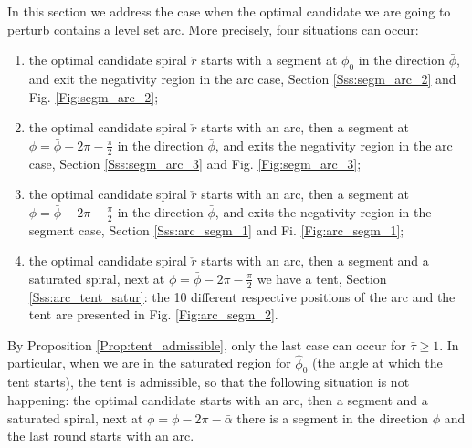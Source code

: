 \documentclass[reqno]{amsart}
\theoremstyle{definition} \newtheorem{definition}{Definition}[section]
\theoremstyle{definition} \newtheorem{remark}[definition]{Remark}
\theoremstyle{plain} \newtheorem{lemma}[definition]{Lemma}
\theoremstyle{plain} \newtheorem{proposition}[definition]{Proposition}
\theoremstyle{plain} \newtheorem{theorem}[definition]{Theorem}
\theoremstyle{plain} \newtheorem{corollary}[definition]{Corollary}
\theoremstyle{definition} \newtheorem{example}[definition]{Example}
\theoremstyle{plain} \newtheorem{claim}[clai]{Claim}
\theoremstyle{definition} \newtheorem{assumption}[definition]{Assumption}
\theoremstyle{definition} \newtheorem{observation}[definition]{Observation}
\newcommand{\1}{\mathbbm 1}
\numberwithin{equation}{section} %
\theoremstyle{plain} \newtheorem*{theorem*}{Theorem}
\theoremstyle{plain} \newtheorem{mthm}[maintheorem]{Main Theorem}
\theoremstyle{plain} \newtheorem*{mthm*}{Main Theorem}
\theoremstyle{plain} \newtheorem*{conjecture*}{Conjecture}
\theoremstyle{plain} \newtheorem{conjecture}[definition]{Conjecture}
\theoremstyle{plain} \newtheorem*{problem*}{Problem}
\begin{document}
In this section we address the case when the optimal candidate we are going to perturb contains a level set arc. More precisely, four situations can occur:
\begin{enumerate}
\item the optimal candidate spiral $\check r$ starts with a segment at $\phi_0$ in the direction $\bar \phi$, and exit the negativity region in the arc case, Section \ref{Sss:segm_arc_2} and Fig. \ref{Fig:segm_arc_2};
\item the optimal candidate spiral $\check r$ starts with an arc, then a segment at $\phi = \bar \phi - 2\pi - \frac{\pi}{2}$ in the direction $\bar \phi$, and exits the negativity region in the arc case, Section \ref{Sss:segm_arc_3} and Fig. \ref{Fig:segm_arc_3};
\item the optimal candidate spiral $\check r$ starts with an arc, then a segment at $\phi = \bar \phi - 2\pi - \frac{\pi}{2}$ in the direction $\bar \phi$, and exits the negativity region in the segment case, Section \ref{Sss:arc_segm_1} and Fi. \ref{Fig:arc_segm_1};
\item the optimal candidate spiral $\check r$ starts with an arc, then a segment and a saturated spiral, next at $\phi = \bar \phi - 2\pi - \frac{\pi}{2}$ we have a tent, Section \ref{Sss:arc_tent_satur}: the 10 different respective positions of the arc and the tent are presented in Fig. \ref{Fig:arc_segm_2}.
\end{enumerate}
By Proposition \ref{Prop:tent_admissible}, only the last case can occur for $\bar \tau \geq 1$. In particular, when we are in the saturated region for $\hat \phi_0$ (the angle at which the tent starts), the tent is admissible, so that the following situation is not happening: the optimal candidate starts with an arc, then a segment and a saturated spiral, next at $\phi = \bar \phi - 2\pi - \bar \alpha$ there is a segment in the direction $\bar \phi$ and the last round starts with an arc.
\end{document}
